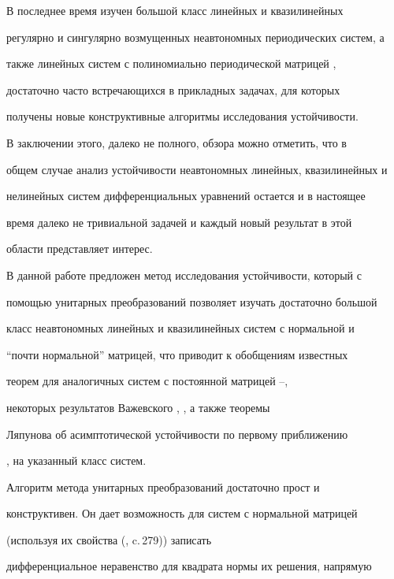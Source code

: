 В последнее время изучен большой класс линейных и квазилинейных 


регулярно и сингулярно возмущенных неавтономных периодических систем, а 


также линейных систем с полиномиально периодической матрицей \cite{11}, 


достаточно часто встречающихся в прикладных задачах, для которых 


получены новые конструктивные алгоритмы исследования устойчивости.





В заключении этого, далеко не полного, обзора можно отметить, что в 


общем случае анализ устойчивости неавтономных линейных, квазилинейных и 


нелинейных систем дифференциальных уравнений остается и в настоящее 


время далеко не тривиальной задачей и каждый новый результат в этой 


области представляет интерес.





В данной работе предложен метод исследования устойчивости, который с 


помощью унитарных преобразований позволяет изучать достаточно большой 


класс неавтономных линейных и квазилинейных систем с нормальной и 


``почти нормальной'' матрицей, что приводит к обобщениям известных 


теорем для аналогичных систем с постоянной матрицей \cite{1}--\cite{7}, 


некоторых результатов Важевского \cite{2}, \cite{7}, а также теоремы


Ляпунова об асимптотической устойчивости по первому приближению 


\cite{1}, \cite{2} на указанный класс систем.





Алгоритм метода унитарных преобразований достаточно прост и 


конструктивен. Он дает возможность для систем с нормальной матрицей 


(используя их свойства (\cite{8}, c.\,279)) записать 


дифференциальное неравенство для квадрата нормы их решения, напрямую 


